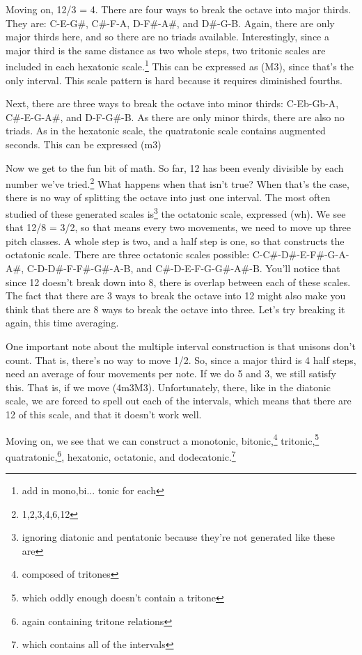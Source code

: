 \documentclass[12pt]{article}[titlepage]
\newcommand{\1}{\={a}}
\newcommand{\2}{\={e}}
\newcommand{\3}{\={\i}}
\newcommand{\4}{\=o}
\newcommand{\5}{\=u}
\newcommand{\6}{\={A}}
\renewcommand{\,}{\textsuperscript{,}}
\begin{document}
Moving on, 12/3 = 4.
There are four ways to break the octave into major thirds.
They are: C-E-G\#, C\#-F-A, D-F\#-A\#, and D\#-G-B.
Again, there are only major thirds here, and so there are no triads available.
Interestingly, since a major third is the same distance as two whole steps, two tritonic scales are included in each hexatonic scale.\footnote{add in mono,bi... tonic for each}
This can be expressed as (M3), since that's the only interval.
This scale pattern is hard because it requires diminished fourths.

Next, there are three ways to break the octave into minor thirds: C-Eb-Gb-A, C\#-E-G-A\#, and D-F-G\#-B.
As there are only minor thirds, there are also no triads.
As in the hexatonic scale, the quatratonic scale contains augmented seconds.
This can be expressed (m3)

Now we get to the fun bit of math.
So far, 12 has been evenly divisible by each number we've tried.\footnote{1,2,3,4,6,12}
What happens when that isn't true?
When that's the case, there is no way of splitting the octave into just one interval.
The most often studied of these generated scales is\footnote{ignoring diatonic and pentatonic because they're not generated like these are} the octatonic scale, expressed (wh).
We see that 12/8 = 3/2, so that means every two movements, we need to move up three pitch classes.
A whole step is two, and a half step is one, so that constructs the octatonic scale.
There are three octatonic scales possible: C-C\#-D\#-E-F\#-G-A-A\#, C-D-D\#-F-F\#-G\#-A-B, and C\#-D-E-F-G-G\#-A\#-B.
You'll notice that since 12 doesn't break down into 8, there is overlap between each of these scales.
The fact that there are 3 ways to break the octave into 12 might also make you think that there are 8 ways to break the octave into three.
Let's try breaking it again, this time averaging.

One important note about the multiple interval construction is that unisons don't count.
That is, there's no way to move 1/2.
So, since a major third is 4 half steps, need an average of four movements per note.
If we do 5 and 3, we still satisfy this.
That is, if we move (4m3M3).
Unfortunately, there, like in the diatonic scale, we are forced to spell out each of the intervals, which means that there are 12 of this scale, and that it doesn't work well.

Moving on, we see that we can construct a monotonic, bitonic,\footnote{composed of tritones} tritonic,\footnote{which oddly enough doesn't contain a tritone} quatratonic,\footnote{again containing tritone relations}, hexatonic, octatonic, and dodecatonic.\footnote{which contains all of the intervals}
\end{document}
